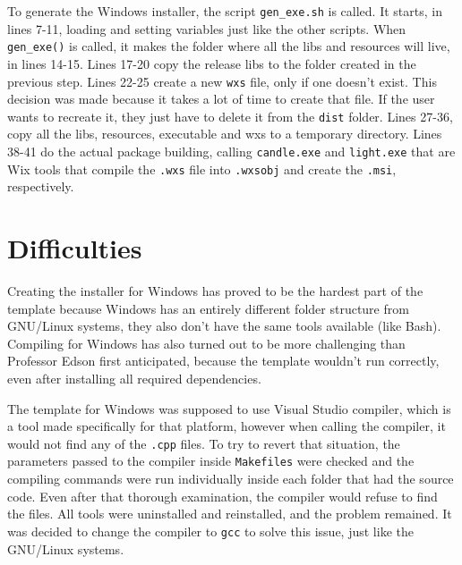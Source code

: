 

To generate the Windows installer, the script \texttt{gen\_exe.sh} is called. It starts, in lines 7-11, loading and setting variables just like the other scripts. When \texttt{gen\_exe()} is called, it makes the folder where all the libs and resources will live, in lines 14-15. Lines 17-20 copy the release libs to the folder created in the previous step. Lines 22-25 create a new \texttt{wxs} file, only if one doesn't exist. This decision was made because it takes a lot of time to create that file. If the user wants to recreate it, they just have to delete it from the \texttt{dist} folder. Lines 27-36, copy all the libs, resources, executable and wxs to a temporary directory. Lines 38-41 do the actual package building, calling \texttt{candle.exe} and \texttt{light.exe} that are Wix tools that compile the \texttt{.wxs} file into \texttt{.wxsobj} and create the \texttt{.msi}, respectively.




\section{Difficulties}
\label{sec:difficulties}

Creating the installer for Windows has proved to be the hardest part of the template because Windows has an entirely different folder structure from GNU/Linux systems, they also don't have the same tools available (like Bash). Compiling for Windows has also turned out to be more challenging than Professor Edson first anticipated, because the template wouldn't run correctly, even after installing all required dependencies.

The template for Windows was supposed to use Visual Studio compiler, which is a tool made specifically for that platform, however when calling the compiler, it would not find any of the \texttt{.cpp} files. To try to revert that situation, the parameters passed to the compiler inside \texttt{Makefiles} were checked and the compiling commands were run individually inside each folder that had the source code. Even after that thorough examination, the compiler would refuse to find the files. All tools were uninstalled and reinstalled, and the problem remained. It was decided to change the compiler to \texttt{gcc} to solve this issue, just like the GNU/Linux systems.

